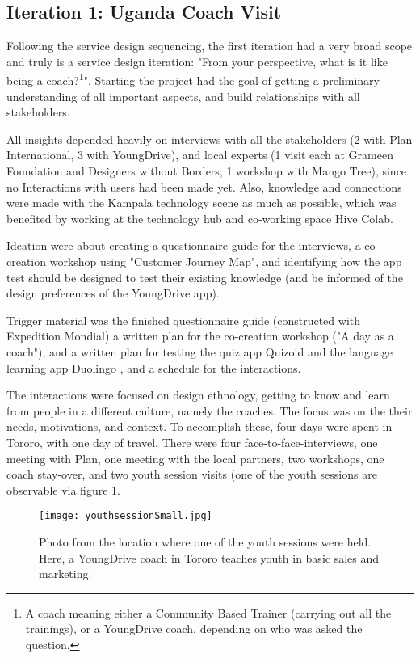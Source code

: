 \subsection{Iteration 1: Uganda Coach Visit}


Following the service design sequencing, the first iteration had a very broad scope and truly is a service design iteration: "From your perspective, what is it like being a coach?\footnote{A coach meaning either a Community Based Trainer (carrying out all the trainings), or a YoungDrive coach, depending on who was asked the question.}". Starting the project had the goal of getting a preliminary understanding of all important aspects, and build relationships with all stakeholders.


All insights depended heavily on interviews with all the stakeholders  (2 with Plan International, 3 with YoungDrive), and local experts (1 visit each at Grameen Foundation and Designers without Borders, 1 workshop with Mango Tree), since no Interactions with users had been made yet. Also, knowledge and connections were made with the Kampala technology scene as much as possible, which was benefited by working at the technology hub and co-working space Hive Colab.

Ideation were about creating a questionnaire guide for the interviews, a co-creation workshop using "Customer Journey Map", and identifying how the app test should be designed to test their existing knowledge (and be informed of the design preferences of the YoungDrive app).

Trigger material was the finished questionnaire guide (constructed with Expedition Mondial) a written plan for the co-creation workshop ("A day as a coach"), and a written plan for testing the quiz app Quizoid \citep{quizoid} and the language learning app Duolingo \citep{duolingo}, and a schedule for the interactions.

The interactions were focused on design ethnology, getting to know and learn from people in a different culture, namely the coaches. The focus was on the their needs, motivations, and context. To accomplish these, four days were spent in Tororo, with one day of travel. There were four face-to-face-interviews,
one meeting with Plan, one meeting with the local partners, two workshops, one coach stay-over, and two youth session visits (one of the youth sessions are observable via figure \ref{fig:youthsession}.

\begin{figure}[h]
    \centering
    \texttt{[image: youthsessionSmall.jpg]}
    \caption{Photo from the location where one of the youth sessions were held. Here, a YoungDrive coach in Tororo teaches youth in basic sales and marketing.}
    \label{fig:youthsession}
\end{figure}
